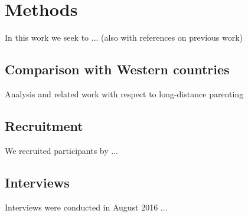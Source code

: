 \section{Methods}
\label{methods}

In this work we seek to ... (also with references on previous work)

\subsection{Comparison with Western countries}
Analysis and related work with respect to long-distance parenting 

\subsection{Recruitment}
We recruited participants by ...

\subsection{Interviews}
Interviews were conducted in August 2016 ...
